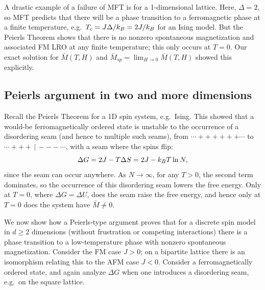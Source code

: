 A drastic example of a failure of MFT is for a 1-dimensional lattice. Here, $\Delta = 2$, so MFT
predicts that there will be a phase transition to a ferromagnetic phase at a finite temperature,
e.g.\ $T_c = J\Delta/k_{B} = 2J/k_{B}$ for an Ising model. But the Peierls Theorem shows that there is no
nonzero spontaneous magnetization and associated FM LRO at any finite temperature; this only occurs
at $T = 0$. Our exact solution for $\bar M(T,H)$ and $\bar M_{sp} = \lim_{H\to 0}\bar M(T,H)$ showed
this explicitly.

\subsection{Peierls argument in two and more dimensions}

Recall the Peierls Theorem for a 1D spin system, e.g.\ Ising. This showed that a would-be
ferromagnetically ordered state is unstable to the occurrence of a disordering seam (and hence to
multiple such seams), from $\cdots{+}{+}{+}{+}{+}{+}\cdots$ to $\cdots{+}{+}{+}\,|\,{-}{-}{-}\cdots$,
with a seam where the spins flip:
\begin{equation}
  \Delta G = 2J - T\Delta S = 2J - k_{B} T\ln N,
\end{equation}
since the seam can occur anywhere. As $N\to\infty$, for any $T>0$, the second term dominates, so
the occurrence of this disordering seam lowers the free energy. Only at $T = 0$, where
$\Delta G = \Delta U$, does the seam raise the free energy, and hence only at $T = 0$ does the system
have $\bar M\ne 0$.

We now show how a Peierls-type argument proves that for a discrete spin model in $d\ge 2$
dimensions (without frustration or competing interactions) there is a phase transition to a
low-temperature phase with nonzero spontaneous magnetization. Consider the FM case $J>0$; on a
bipartite lattice there is an isomorphism relating this to the AFM case $J<0$. Consider a
ferromagnetically ordered state, and again analyze $\Delta G$ when one introduces a disordering
seam, e.g.\ on the square lattice.

\begin{diagram}
\end{diagram}

